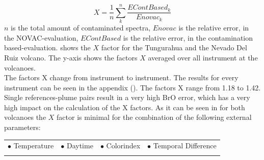 \documentclass  [
  paper    = a4,
  BCOR     = 10mm,
  twoside,
  fontsize = 12pt,
  fleqn,
  toc      = bibnumbered,
  toc      = listofnumbered,
  numbers  = noendperiod,
  headings = normal,
  listof   = leveldown,
  version  = 3.03
]                                       {scrreprt}
\begin{document}
	\begin{equation}
	X = \frac{1}{n}\sum_{k}^{n} \frac{EContBased_{ k}}{Enovac_{ k}}
	\label{eq:mean}
	\end{equation}
	$n$ is the total amount of contaminated spectra, $Enovac$ is the relative   error, in the NOVAC-evaluation, $EContBased$ is the relative   error, in the contamination based-evaluation. 
	 shows the $X$ factor for the Tungurahua and the Nevado Del Ruiz volcano. The y-axis shows the factors $X$ averaged over all instrument at the volcanoes.\\
	The factors X change from instrument to instrument. The results for every instrument can be seen in the appendix (). The factors X range from 1.18 to 1.42.\\
	Single references-plume pairs result in a very high BrO error, which has a very high impact on the calculation of the X factors. 
	As it can be seen in   for both volcanoes the $X$ factor is minimal for the combination of the following external parameters:\\
	
	\begin{table}[h!]
			\begin{tabular}{cccc}
		$\bullet$ Temperature & $\bullet$ Daytime&  $\bullet$ Colorindex & $\bullet$ Temporal Difference\\
		\label{tab:importantexternalParam}
		\end{tabular}
	\end{table}
%	
\end{document}
